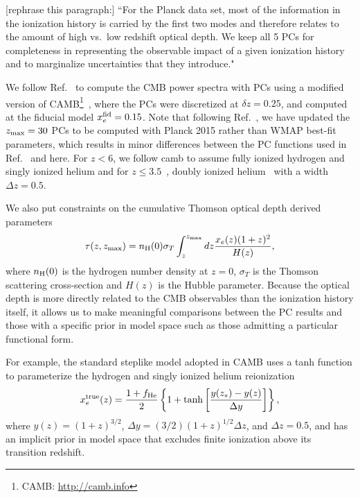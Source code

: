 \documentclass[prd,twocolumn,amsmath,amssymb,floatfix,superscriptaddress,nofootinbib]{revtex4-1}
\newcommand{\zmax}{z_{\rm max}}
\begin{document}
[rephrase this paragraph:]
``For the Planck data set, most of the information in the ionization history is carried by the
first two modes and therefore relates to the amount of high vs.~low redshift optical depth. We keep all 5 PCs  for completeness in representing the observable
impact of a given ionization history and to marginalize uncertainties that they introduce."

We follow Ref.~\cite{Heinrich:2018btc} to compute the CMB power spectra with PCs using a modified version of CAMB\footnote{CAMB: \url{http://camb.info}}~\cite{Lewis:1999bs, Howlett:2012mh}, where the PCs were discretized at $\delta z = 0.25$, and computed at the fiducial model $x_e^{\rm fid} = 0.15$. Note that following Ref.~\cite{Heinrich:2018btc}, we have updated the $\zmax = 30$ PCs to be computed with Planck 2015 rather than WMAP best-fit parameters, which results in minor differences between the PC functions used in Ref.~\cite{Heinrich:2016ojb} and here. For $z<6$, we follow camb to assume fully ionized hydrogen and singly ionized helium and for $z\leq 3.5$~\cite{Becker:2010cu}, doubly ionized helium~\cite{Becker:2010cu} with a width  $\Delta z = 0.5$. 
 
We also put constraints on the cumulative Thomson optical depth derived parameters 
\begin{equation}
\tau(z,z_{\rm max}) = n_{\rm H}(0) \sigma_T \int_z^{z_{\rm max}} dz \frac{x_e(z) (1+z)^{2} }{H(z)},
\label{eq:cumtau}
\end{equation}
where $n_{\rm H}(0)$ is the hydrogen number density at $z=0$, $\sigma_T$ is the Thomson scattering cross-section and $H(z)$ is the Hubble parameter. Because the optical depth is more directly related to the CMB observables than the ionization history itself, it allows us to make meaningful comparisons between the PC results and those with a specific prior in model space such as those admitting a particular functional form.

For example, the standard steplike model adopted in CAMB uses a tanh function to parameterize the hydrogen and singly ionized helium reionization
 \begin{equation}
x_e^{\rm true}(z) = \frac{1+f_{\rm He}}{2}\left\{  1+ \tanh\left[ \frac{y(z_*)-y(z)}{\Delta y} \right] \right\},
 \label{eqn:tanh}
 \end{equation}
 where $y(z)=(1+z)^{3/2}$, $\Delta y=(3/2)(1+z)^{1/2}\Delta z$, and $\Delta z = 0.5$,
and has an implicit prior in model space that excludes finite ionization above its transition redshift.
 
\end{document}
